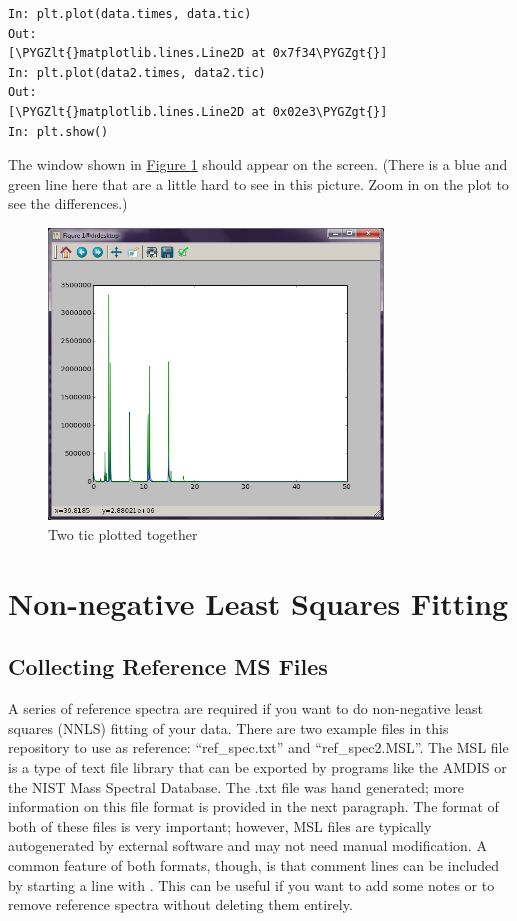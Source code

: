 \documentclass[letterpaper,10pt,english]{sphinxmanual}
\def\PYGZlt{\char`\<}
\def\PYGZgt{\char`\>}
\begin{document}
\begin{Verbatim}[commandchars=\\\{\}]
In: plt.plot(data.times, data.tic)
Out:
[\PYGZlt{}matplotlib.lines.Line2D at 0x7f34\PYGZgt{}]
In: plt.plot(data2.times, data2.tic)
Out:
[\PYGZlt{}matplotlib.lines.Line2D at 0x02e3\PYGZgt{}]
In: plt.show()
\end{Verbatim}

The window shown in \hyperref[basics:twotic]{Figure  \ref*{basics:twotic}} should appear on the screen. (There
is a blue and green line here that are a little hard to see in this picture.
Zoom in on the plot to see the differences.)
\begin{figure}[htbp]
\centering
\capstart

\includegraphics[width=3.5in]{tic2.png}
\caption{Two tic plotted together}\label{basics:twotic}\end{figure}


\chapter{Non-negative Least Squares Fitting}
\label{fitting:non-negative-least-squares-fitting}\label{fitting::doc}

\section{Collecting Reference MS Files}
\label{fitting:collecting-reference-ms-files}
A series of reference spectra are required if you want to do non-negative
least squares (NNLS) fitting of your data. There are two example files in this
repository to use as reference: ``ref\_spec.txt'' and ``ref\_spec2.MSL''. The MSL
file is a type of text file library that can be exported by programs like the
AMDIS or the NIST Mass Spectral Database. The .txt file was hand generated;
more information on this file format is provided in the next paragraph. The
format of both of these files is very important; however, MSL files are
typically autogenerated by external software and may not need manual
modification. A common feature of both formats, though, is that comment lines
can be included by starting a line with \code{\#}. This can be useful if you want
to add some notes or to remove reference spectra without deleting them
entirely.
\end{document}
